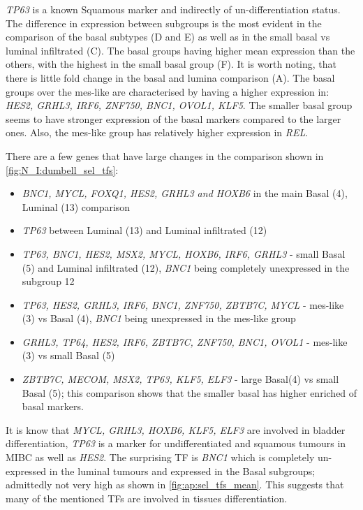 \textit{TP63} is a known Squamous marker \citet{Robertson2023-na} and indirectly of un-differentiation status. The difference in expression between subgroups is the most evident in the comparison of the basal subtypes (D and E) as well as in the small basal vs luminal infiltrated (C). The basal groups having higher mean expression than the others, with the highest in the small basal group (F). It is worth noting, that there is little fold change in the basal and lumina comparison (A). The basal groups over the mes-like are characterised by having a higher expression in: \textit{HES2, GRHL3, IRF6, ZNF750, BNC1, OVOL1, KLF5}. The smaller basal group seems to have stronger expression of the basal markers compared to the larger ones. Also, the mes-like group has relatively higher expression in \textit{REL}.

There are a few genes that have large changes in the comparison shown in \cref{fig:N_I:dumbell_sel_tfs}: 
\begin{itemize}
    \item \textit{BNC1, MYCL, FOXQ1, HES2, GRHL3 and HOXB6} in the main Basal (4), Luminal (13) comparison
    \item \textit{TP63} between Luminal (13) and Luminal infiltrated (12)
    \item \textit{TP63, BNC1, HES2, MSX2, MYCL, HOXB6, IRF6, GRHL3} - small Basal (5) and Luminal infiltrated (12), \textit{BNC1} being completely unexpressed in the subgroup 12
    \item \textit{TP63, HES2, GRHL3, IRF6, BNC1, ZNF750, ZBTB7C, MYCL} - mes-like (3) vs Basal (4), \textit{BNC1} being unexpressed in the mes-like group
    \item \textit{GRHL3, TP64, HES2, IRF6, ZBTB7C, ZNF750, BNC1, OVOL1} - mes-like (3) vs small Basal (5) 
    \item \textit{ZBTB7C, MECOM, MSX2, TP63, KLF5, ELF3} - large Basal(4) vs small Basal (5); this comparison shows that the smaller basal has higher enriched of basal markers.
\end{itemize}


It is know that \textit{MYCL, GRHL3, HOXB6, KLF5, ELF3} are involved in bladder differentiation, \textit{TP63} is a marker for undifferentiated and squamous tumours in MIBC as well as \textit{HES2}. The surprising TF is \textit{BNC1} which is completely un-expressed in the luminal tumours and expressed in the Basal subgroups; admittedly not very high as shown in \cref{fig:ap:sel_tfs_mean}. This suggests that many of the mentioned TFs are involved in tissues differentiation.

